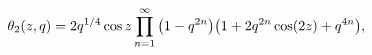 \[\mathop{\theta_{2}\/}\nolimits\!\left(z,q\right)=2q^{1/4}\mathop{\cos\/}%
\nolimits z\prod\limits_{n=1}^{\infty}{\left(1-q^{2n}\right)}{\left(1+2q^{2n}%
\mathop{\cos\/}\nolimits\!\left(2z\right)+q^{4n}\right)},\]